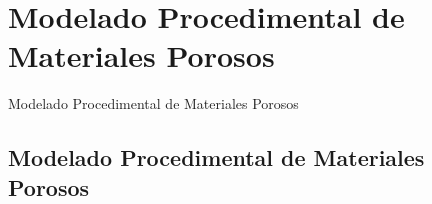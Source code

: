 \documentclass[spanish,unknownkeysallowed]{beamer}
\begin{document}
\section[Mod. de Materiales Porosos]{Modelado Procedimental de Materiales Porosos}

\begin{frame}
\begin{block}{}
\begin{center}
\vspace{1cm}
\huge{Modelado Procedimental de Materiales Porosos}
\vspace{1cm}
\end{center}
\end{block}
\end{frame}

\subsection{Modelado Procedimental de Materiales Porosos}
\end{document}
